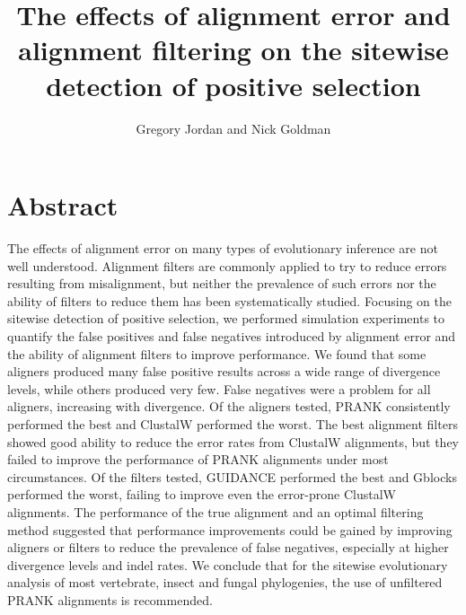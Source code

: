 \documentclass{article}
\begin{document}
\newcommand{\pranka}{PRANK$_{\textrm{AA}}$\xspace}
\newcommand{\prankc}{PRANK$_{\textrm{C}}$\xspace}
\newcommand{\omg}{\bm{\omega}\xspace}
\newcommand{\tpr}{TPR$_{1\%}$\xspace}
\newcommand{\sw}{sitewise\xspace}
\newcommand{\Sw}{Sitewise\xspace}
\newcommand{\Dr}{{\em Drosophila}\xspace}

\title{The effects of alignment error and alignment filtering on the \sw detection of positive selection}

\author{{Gregory Jordan and Nick Goldman}\\
}

\section*{Abstract}

The effects of alignment error on many types of evolutionary inference
are not well understood. Alignment filters are commonly applied to try
to reduce errors resulting from misalignment, but neither the
prevalence of such errors nor the ability of filters to reduce them
has been systematically studied. Focusing on the sitewise detection of
positive selection, we performed simulation experiments to quantify
the false positives and false negatives introduced by alignment error
and the ability of alignment filters to improve performance. We found
that some aligners produced many false positive results across a wide
range of divergence levels, while others produced very few. False
negatives were a problem for all aligners, increasing with
divergence. Of the aligners tested, PRANK consistently performed the
best and ClustalW performed the worst. The best alignment filters
showed good ability to reduce the error rates from ClustalW
alignments, but they failed to improve the performance of PRANK
alignments under most circumstances. Of the filters tested, GUIDANCE
performed the best and Gblocks performed the worst, failing to improve
even the error-prone ClustalW alignments. The performance of the true
alignment and an optimal filtering method suggested that performance
improvements could be gained by improving aligners or filters to
reduce the prevalence of false negatives, especially at higher
divergence levels and indel rates. We conclude that for the sitewise
evolutionary analysis of most vertebrate, insect and fungal
phylogenies, the use of unfiltered PRANK alignments is recommended.
\end{document}
